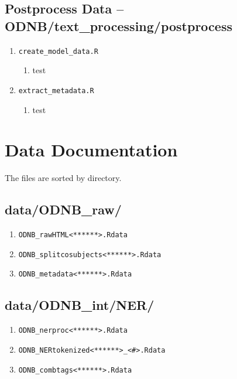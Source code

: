 \documentclass[11pt]{article}
\newcommand{\filename}[1]{\texttt{#1}}
\begin{document}
\subsection{Postprocess Data -- ODNB/text\_processing/postprocess}
\begin{enumerate}
\item \filename{create\_model\_data.R}
\begin{enumerate}
\item test
\end{enumerate}


\item \filename{extract\_metadata.R}
\begin{enumerate}
\item test
\end{enumerate}


\end{enumerate}




\section{Data Documentation}
The files are sorted by directory. 

\subsection{data/ODNB\_raw/}
\begin{enumerate}
\item \filename{ODNB\_rawHTML<******>.Rdata}
\item \filename{ODNB\_splitcosubjects<******>.Rdata}
\item \filename{ODNB\_metadata<******>.Rdata}
\end{enumerate}

\subsection{data/ODNB\_int/NER/}
\begin{enumerate}
\item \filename{ODNB\_nerproc<******>.Rdata}
\item \filename{ODNB\_NERtokenized<******>\_<\#>.Rdata}
\item \filename{ODNB\_combtags<******>.Rdata}
\end{enumerate}
\end{document}
